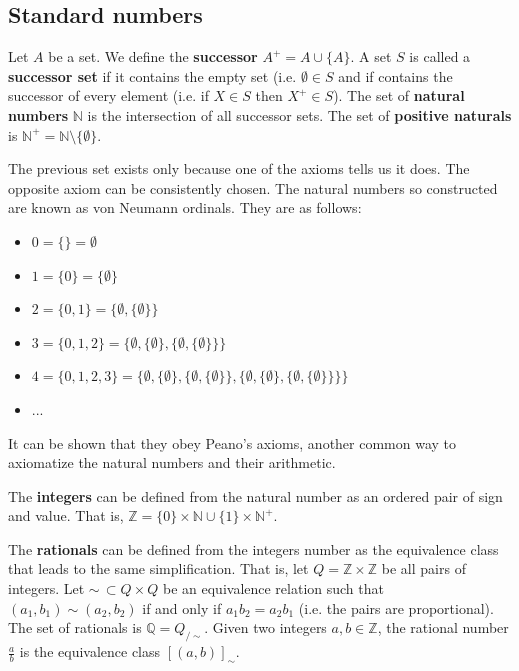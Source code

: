 \documentclass{article}
\begin{document}
\subsection{Standard numbers}

\begin{defn}\label{defn_successor_set}
	Let $A$ be a set. We define the \textbf{successor} $A^+ = A \cup \{A\}$. A set $S$ is called a \textbf{successor set} if it contains the empty set (i.e. $\emptyset \in S$ and if contains the successor of every element (i.e. if $X \in S$ then $X^+ \in S$). The set of \textbf{natural numbers} $\mathbb{N}$ is the intersection of all successor sets. The set of \textbf{positive naturals} is $\mathbb{N}^+ = \mathbb{N} \setminus \{ \emptyset \}$.
\end{defn}
\begin{remark}
	The previous set exists only because one of the axioms tells us it does. The opposite axiom can be consistently chosen. The natural numbers so constructed are known as von Neumann ordinals. They are as follows:
	\begin{itemize}
		\item $0 = \{ \} = \emptyset$
		\item $1 = \{ 0 \} = \{ \emptyset \}$
		\item $2 = \{0, 1\} = \{ \emptyset, \{ \emptyset\} \}$
		\item $3 = \{0, 1, 2\} = \{ \emptyset, \{ \emptyset\}, \{ \emptyset, \{ \emptyset\} \} \}$
		\item $4 = \{0, 1, 2, 3\} = \{ \emptyset, \{ \emptyset\}, \{ \emptyset, \{ \emptyset\} \}, \{ \emptyset, \{ \emptyset\}, \{ \emptyset, \{ \emptyset\} \} \} \}$
		\item ...
	\end{itemize}
	It can be shown that they obey Peano's axioms, another common way to axiomatize the natural numbers and their arithmetic.
\end{remark}

\begin{defn}
	The \textbf{integers} can be defined from the natural number as an ordered pair of sign and value. That is, $\mathbb{Z} = \{ 0 \} \times \mathbb{N} \cup \{ 1 \} \times \mathbb{N}^+$.
\end{defn}

\begin{defn}
	The \textbf{rationals} can be defined from the integers number as the equivalence class that leads to the same simplification. That is, let $Q = \mathbb{Z} \times \mathbb{Z}$ be all pairs of integers. Let $\sim \, \subset Q \times Q$ be an equivalence relation such that $(a_1, b_1) \sim (a_2, b_2)$ if and only if $a_1 b_2 = a_2 b_1$ (i.e. the pairs are proportional). The set of rationals is $\mathbb{Q} = Q_{/\sim}$. Given two integers $a, b \in \mathbb{Z}$, the rational number $\frac{a}{b}$ is the equivalence class $[(a,b)]_{\sim}$.
\end{defn}
\end{document}
